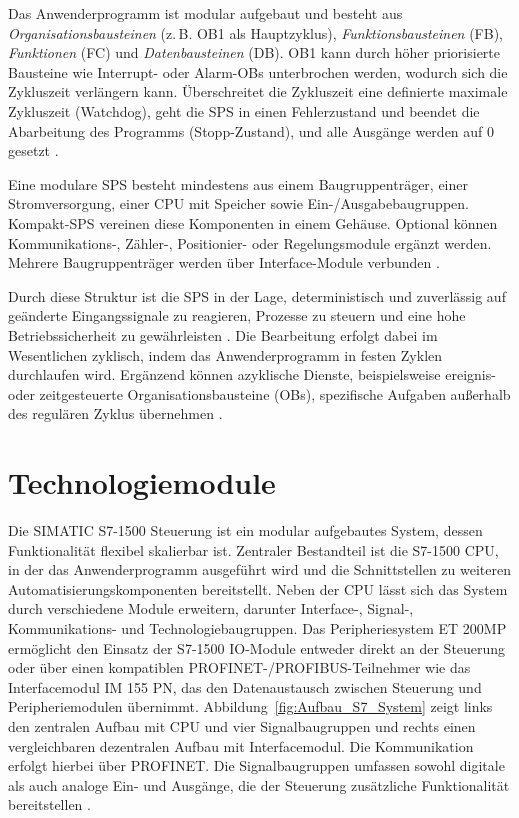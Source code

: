 Das Anwenderprogramm ist modular aufgebaut und besteht aus 
\textit{Organisationsbausteinen} (z.\,B. OB1 als Hauptzyklus), 
\textit{Funktionsbausteinen} (FB), \textit{Funktionen} (FC) und 
\textit{Datenbausteinen} (DB). OB1 kann durch höher priorisierte Bausteine wie 
Interrupt- oder Alarm-OBs unterbrochen werden, wodurch sich die Zykluszeit 
verlängern kann. Überschreitet die Zykluszeit eine definierte maximale Zykluszeit (Watchdog), 
geht die SPS in einen Fehlerzustand und beendet die Abarbeitung des Programms (Stopp-Zustand), 
und alle Ausgänge werden auf 0 gesetzt \cite{siemens_s7_function_blocks}.

Eine modulare SPS besteht mindestens aus einem Baugruppenträger, einer 
Stromversorgung, einer CPU mit Speicher sowie Ein-/Ausgabebaugruppen. 
Kompakt-SPS vereinen diese Komponenten in einem Gehäuse. Optional können 
Kommunikations-, Zähler-, Positionier- oder Regelungsmodule ergänzt werden. 
Mehrere Baugruppenträger werden über Interface-Module verbunden 
\cite{heinrich_automatisierung}.

Durch diese Struktur ist die SPS in der Lage, deterministisch und zuverlässig auf 
geänderte Eingangssignale zu reagieren, Prozesse zu steuern und eine hohe 
Betriebssicherheit zu gewährleisten \cite{heinrich_automatisierung}.
Die Bearbeitung erfolgt dabei im Wesentlichen 
zyklisch, indem das Anwenderprogramm in festen Zyklen durchlaufen wird. Ergänzend 
können azyklische Dienste, beispielsweise ereignis- oder zeitgesteuerte 
Organisationsbausteine (OBs), spezifische Aufgaben außerhalb des regulären 
Zyklus übernehmen \cite{berger2017,bee2022}.

\section{Technologiemodule}

Die SIMATIC S7-1500 Steuerung ist ein modular aufgebautes System, dessen Funktionalität flexibel skalierbar ist. Zentraler Bestandteil ist die S7-1500 CPU, in der das Anwenderprogramm ausgeführt wird und die Schnittstellen zu weiteren Automatisierungskomponenten bereitstellt. Neben der CPU lässt sich das System durch verschiedene Module erweitern, darunter Interface-, Signal-, Kommunikations- und Technologiebaugruppen. Das Peripheriesystem ET 200MP ermöglicht den Einsatz der S7-1500 IO-Module entweder direkt an der Steuerung oder über einen kompatiblen PROFINET-/PROFIBUS-Teilnehmer wie das Interfacemodul IM 155 PN, das den Datenaustausch zwischen Steuerung und Peripheriemodulen übernimmt. Abbildung~\ref{fig:Aufbau_S7_System} zeigt links den zentralen Aufbau mit CPU und vier Signalbaugruppen und rechts einen vergleichbaren dezentralen Aufbau mit Interfacemodul. Die Kommunikation erfolgt hierbei über PROFINET. Die Signalbaugruppen umfassen sowohl digitale als auch analoge Ein- und Ausgänge, die der Steuerung zusätzliche Funktionalität bereitstellen \cite{siemensET200MP}.


